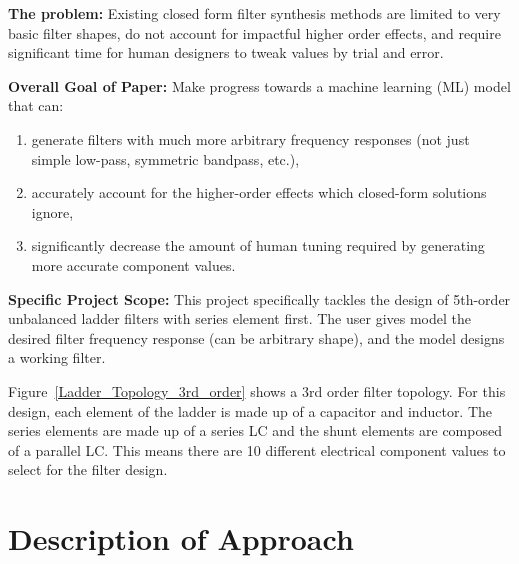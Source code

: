 \documentclass[10pt,conference]{IEEEtran}
\begin{document}
\vspace{1em}

\textbf{The problem:}
Existing closed form filter synthesis methods are limited to very basic filter shapes, do not account for impactful higher order effects, and require significant time for human designers to tweak values by trial and error.

\vspace{1em}

\textbf{Overall Goal of Paper:}
Make progress towards a machine learning (ML) model that can:
\begin{enumerate}[label=\arabic*)]
    \item generate filters with much more arbitrary frequency responses (not just simple low-pass, symmetric bandpass, etc.),
    \item accurately account for the higher-order effects which closed-form solutions ignore,
    \item significantly decrease the amount of human tuning required by generating more accurate component values.
\end{enumerate}

\vspace{1em}

\textbf{Specific Project Scope:}
This project specifically tackles the design of 5th-order unbalanced ladder filters with series element first. The user gives model the desired filter frequency response (can be arbitrary shape), and the model designs a working filter.

Figure~\ref{Ladder_Topology_3rd_order} shows a 3rd order filter topology. For this design, each element of the ladder is made up of a capacitor and inductor. The series elements are made up of a series LC and the shunt elements are composed of a parallel LC. This means there are 10 different electrical component values to select for the filter design.






\section{Description of Approach}
\end{document}
